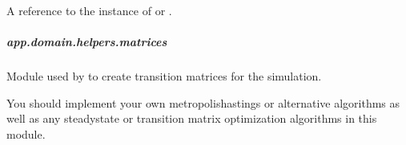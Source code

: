 \documentclass[letterpaper,10pt,english]{sphinxmanual}
\begin{document}
\begin{fulllineitems}
\begin{fulllineitems}
\end{fulllineitems}


\begin{fulllineitems}
\label{\detokenize{app.domain.helpers:app.domain.helpers.matlab_utils.MatlabEngineContainer._instance}}
A reference to the instance of  or .

\end{fulllineitems}


\end{fulllineitems}



\subparagraph{app.domain.helpers.matrices}
\label{\detokenize{app.domain.helpers:module-app.domain.helpers.matrices}}\label{\detokenize{app.domain.helpers:app-domain-helpers-matrices}}
Module used by  to create transition
matrices for the simulation.

You should implement your own metropolis\sphinxhyphen{}hastings or alternative algorithms
as well as any steady\sphinxhyphen{}state or transition matrix optimization algorithms in
this module.
\end{document}
